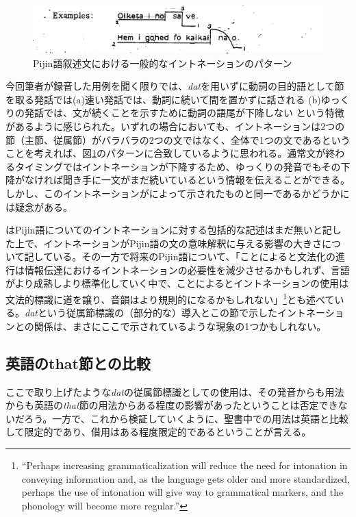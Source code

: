 \begin{figure}[ht]
  \includegraphics[width=15cm]{./intonation.png}
  \caption{Pijin語叙述文における一般的なイントネーションのパターン\cite[10]{eric}}
  \label{fig:intonation}
\end{figure}

今回筆者が録音した用例を聞く限りでは、\textit{dat}を用いずに動詞の目的語として節を取る発話では(a)速い発話では、動詞に続いて間を置かずに話される (b)ゆっくりの発話では、文が続くことを示すために動詞の語尾が下降しない という特徴があるように感じられた。いずれの場合においても、イントネーションは2つの節（主節、従属節）がバラバラの2つの文ではなく、全体で1つの文であるということを考えれば、図\ref{fig:intonation}のパターンに合致しているように思われる。通常文が終わるタイミングではイントネーションが下降するため、ゆっくりの発音でもその下降がなければ聞き手に一文がまだ続いているという情報を伝えることができる。しかし、このイントネーションが\cite{eric}によって示されたものと同一であるかどうかには疑念がある。

\cite{phonology}はPijin語についてのイントネーションに対する包括的な記述はまだ無いと記した上で、イントネーションがPijin語の文の意味解釈に与える影響の大きさについて記している。その一方で将来のPijin語について、「ことによると文法化の進行は情報伝達におけるイントネーションの必要性を減少させるかもしれず、言語がより成熟しより標準化していく中で、ことによるとイントネーションの使用は文法的標識に道を譲り、音韻はより規則的になるかもしれない」\footnote{``Perhaps increasing grammaticalization will reduce the need for intonation in conveying information and, as the language gets older and more standardized, perhaps the use of intonation will give way to grammatical markers, and the phonology will become more regular.''\citep{phonology}}\citep{phonology}とも述べている。\textit{dat}という従属節標識の（部分的な）導入とこの節で示したイントネーションとの関係は、まさにここで示されているような現象の1つかもしれない。

\subsection{英語のthat節との比較}

ここで取り上げたような\textit{dat}の従属節標識としての使用は、その発音からも用法からも英語の\textit{that}節の用法からある程度の影響があったということは否定できないだろう。一方で、これから検証していくように、聖書中での用法は英語と比較して限定的であり、借用はある程度限定的であるということが言える。

